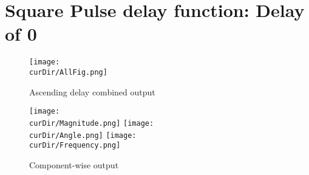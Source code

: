 \newpage
\newcommand{\curDir}{PMUsim-figures/Square/DelayOf_0}
\section{Square Pulse delay function: Delay of 0}
\begin{figure}[hb]
    \texttt{[image: \\curDir/AllFig.png]}    
    \caption{Ascending delay combined output}
    \label{fig:PMUsim-Asc6-allfig}
\end{figure}


     \begin{figure}
        \caption{Component-wise output}
 
    \texttt{[image: \\curDir/Magnitude.png]}    
         \label{fig:PMUsim-Asc6Mag}
   \texttt{[image: \\curDir/Angle.png]}    
         \label{fig:PMUsim-Asc6Ang}
   \texttt{[image: \\curDir/Frequency.png]}    
         \label{fig:PMUsim-Asc6Freq}
 
\end{figure}


